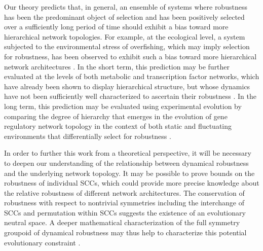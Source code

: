 Our theory predicts that, in general, an ensemble of systems where robustness has been the predominant object of selection and has been positively selected over a sufficiently long period of time should exhibit a bias toward more hierarchical network topologies. For example, at the ecological level, a system subjected to the environmental stress of overfishing, which may imply selection for robustness, has been observed to exhibit such a bias toward more hierarchical network architectures \cite{Bascompte2005}. In the short term, this prediction may be further evaluated at the levels of both metabolic and transcription factor networks, which have already been shown to display hierarchical structure, but whose dynamics have not been sufficiently well characterized to ascertain their robustness \cite{Zhao2006,Bhardwaj2010,Colm}.
In the long term, this prediction may be evaluated using experimental evolution by comparing the degree of hierarchy that emerges in the evolution of gene regulatory network topology in the context of both static and fluctuating environments that differentially select for robustness \cite{Leroi1994}.

In order to further this work from a theoretical perspective, it will be necessary to deepen our understanding of the relationship between dynamical robustness and the underlying network topology.
It may be possible to prove bounds on the robustness of individual SCCs, which could provide more precise knowledge about the relative robustness of different network architectures. The conservation of robustness with respect to nontrivial symmetries including the interchange of SCCs and permutation within SCCs suggests the existence of an evolutionary neutral space. A deeper mathematical characterization of the full symmetry groupoid of dynamical robustness may thus help to characterize this potential evolutionary constraint \cite{Golubitsky2006}.

